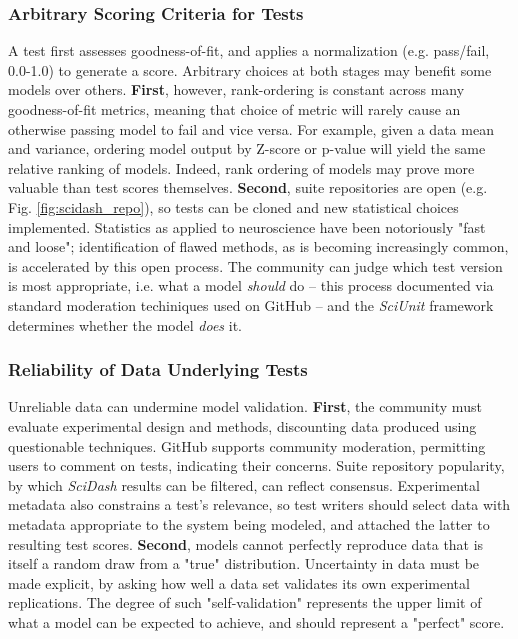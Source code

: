 \documentclass[11pt,letterpaper]{article}
\begin{document}
\subsubsection{Arbitrary Scoring Criteria for Tests}
A test first assesses goodness-of-fit, and applies a normalization (e.g. pass/fail, 0.0-1.0) to generate a score.  Arbitrary choices at both stages may benefit some models over others.  \textbf{First}, however, rank-ordering is constant across many goodness-of-fit metrics, meaning that choice of metric will rarely cause an otherwise passing model to fail and vice versa.  For example, given a data mean and variance, ordering model output by Z-score or p-value will yield the same relative ranking of models. Indeed, rank ordering of models may prove more valuable than test scores themselves. \textbf{Second}, suite repositories are open (e.g. Fig. \ref{fig:scidash_repo}), so tests can be cloned and new statistical choices implemented. Statistics as applied to neuroscience have been notoriously "fast and loose"; identification of flawed methods, as is becoming increasingly common\cite{that one dead fish fMRI paper; ionadis paper; double-dipping paper}, is accelerated by this open process. The community can judge which test version is most appropriate, i.e. what a model \textit{should} do -- this process documented via standard moderation techiniques used on GitHub -- and the \textit{SciUnit} framework determines whether the model \textit{does} it.  

\subsubsection{Reliability of Data Underlying Tests}
Unreliable data can undermine model validation. \textbf{First}, the community must evaluate experimental design and methods, discounting data produced using questionable techniques.  GitHub supports community moderation, permitting users to comment on tests, indicating their concerns.  Suite repository popularity, by which \textit{SciDash} results can be filtered, can reflect consensus.  Experimental metadata also constrains a test's relevance, so test writers should select data with metadata appropriate to the system being modeled, and attached the latter to resulting test scores.  \textbf{Second}, models cannot perfectly reproduce data that is itself a random draw from a "true" distribution.  Uncertainty in data must be made explicit, by asking how well a data set validates its own experimental replications\cite{kriegeskorte_representational_2008}.  The degree of such "self-validation" represents the upper limit of what a model can be expected to achieve, and should represent a "perfect" score.  
\end{document}
